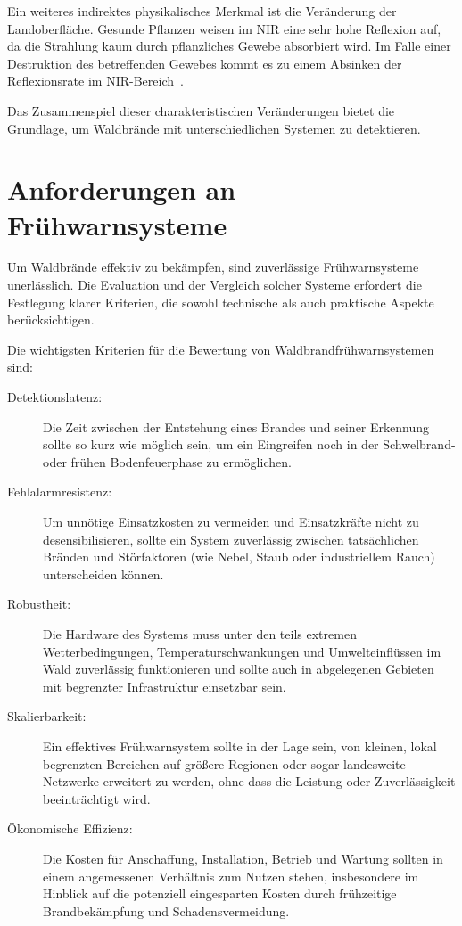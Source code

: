 Ein weiteres indirektes physikalisches Merkmal ist die Veränderung der Landoberfläche. Gesunde Pflanzen weisen im \acs{NIR} eine sehr hohe Reflexion auf, da die Strahlung kaum durch pflanzliches Gewebe absorbiert wird. Im Falle einer Destruktion des betreffenden Gewebes kommt es zu einem Absinken der Reflexionsrate im \acs{NIR}-Bereich~\cite{Allison2016, Velten2002,Bernhard2010}.

Das Zusammenspiel dieser charakteristischen Veränderungen bietet die Grundlage, um Waldbrände mit unterschiedlichen Systemen zu detektieren.


\chapter{Anforderungen an Frühwarnsysteme}\label{ch:anforderungen}

Um Waldbrände effektiv zu bekämpfen, sind zuverlässige Frühwarnsysteme unerlässlich. Die Evaluation und der Vergleich solcher Systeme erfordert die Festlegung klarer Kriterien, die sowohl technische als auch praktische Aspekte berücksichtigen.

Die wichtigsten Kriterien für die Bewertung von Waldbrandfrühwarnsystemen sind:
\begin{description}
    \item[Detektionslatenz:] Die Zeit zwischen der Entstehung eines Brandes und seiner Erkennung sollte so kurz wie möglich sein, um ein Eingreifen noch in der Schwelbrand- oder frühen Bodenfeuerphase zu ermöglichen.

    \item[Fehlalarmresistenz:] Um unnötige Einsatzkosten zu vermeiden und Einsatzkräfte nicht zu desensibilisieren, sollte ein System zuverlässig zwischen tatsächlichen Bränden und Störfaktoren (wie Nebel, Staub oder industriellem Rauch) unterscheiden können.

    \item[Robustheit:] Die Hardware des Systems muss unter den teils extremen Wetterbedingungen, Temperaturschwankungen und Umwelteinflüssen im Wald zuverlässig funktionieren und sollte auch in abgelegenen Gebieten mit begrenzter Infrastruktur einsetzbar sein.

    \item[Skalierbarkeit:] Ein effektives Frühwarnsystem sollte in der Lage sein, von kleinen, lokal begrenzten Bereichen auf größere Regionen oder sogar landesweite Netzwerke erweitert zu werden, ohne dass die Leistung oder Zuverlässigkeit beeinträchtigt wird.

    \item[Ökonomische Effizienz:] Die Kosten für Anschaffung, Installation, Betrieb und Wartung sollten in einem angemessenen Verhältnis zum Nutzen stehen, insbesondere im Hinblick auf die potenziell eingesparten Kosten durch frühzeitige Brandbekämpfung und Schadensvermeidung.

\end{description} 
~\cite{Allison2016,Velten2002, ITESG2021}



